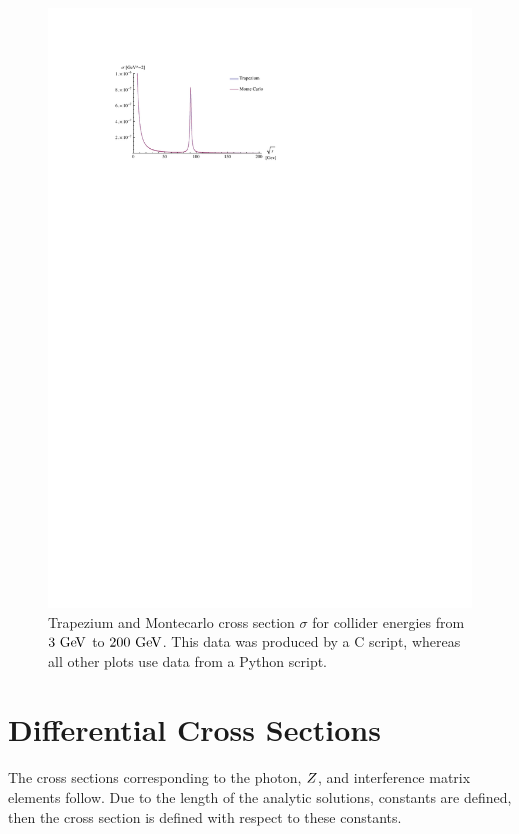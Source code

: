 \documentclass[]{article}
\begin{document}
\begin{figure}[H]
	\vspace{10pt}
	\hspace*{-0.1\textwidth}
	\centering
	\label{fig:cboth}
	\includegraphics[width=1.2\textwidth]{c_both}
	\caption{Trapezium and Montecarlo cross section $\sigma$ for collider energies from $3\GeV$ to $200\GeV$. This data was produced by a C script, whereas all other plots use data from a Python script.}
	\label{fig:bothfocused}
\end{figure}

\newpage

\appendix
\section{Differential Cross Sections}\label{app:differentials}

The cross sections corresponding to the photon, $Z $, and interference matrix elements follow. Due to the length of the analytic solutions, constants are defined, then the cross section is defined with respect to these constants.
\end{document}
